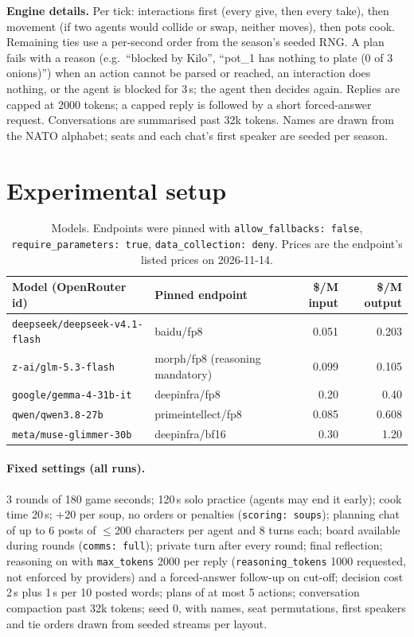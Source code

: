 \documentclass{article}
\begin{document}
\textbf{Engine details.} Per tick: interactions first (every give, then every take), then movement (if two agents would collide or swap, neither moves), then pots cook. Remaining ties use a per-second order from the season's seeded RNG. A plan fails with a reason (e.g.\ ``blocked by Kilo'', ``pot\_1 has nothing to plate (0 of 3 onions)'') when an action cannot be parsed or reached, an interaction does nothing, or the agent is blocked for 3\,s; the agent then decides again. Replies are capped at 2000 tokens; a capped reply is followed by a short forced-answer request. Conversations are summarised past 32k tokens. Names are drawn from the NATO alphabet; seats and each chat's first speaker are seeded per season.

\section{Experimental setup}\label{app:setup}
\begin{table}[h]
\centering\small
\begin{tabular}{llrr}
\toprule
Model (OpenRouter id) & Pinned endpoint & \$/M input & \$/M output\\
\midrule
\texttt{deepseek/deepseek-v4.1-flash} & baidu/fp8 & 0.051 & 0.203\\
\texttt{z-ai/glm-5.3-flash} & morph/fp8 (reasoning mandatory) & 0.099 & 0.105\\
\texttt{google/gemma-4-31b-it} & deepinfra/fp8 & 0.20 & 0.40\\
\texttt{qwen/qwen3.8-27b} & primeintellect/fp8 & 0.085 & 0.608\\
\texttt{meta/muse-glimmer-30b} & deepinfra/bf16 & 0.30 & 1.20\\
\bottomrule
\end{tabular}
\caption{Models. Endpoints were pinned with \texttt{allow\_fallbacks: false}, \texttt{require\_parameters: true}, \texttt{data\_collection: deny}. Prices are the endpoint's listed prices on 2026-11-14.}
\end{table}

\paragraph{Fixed settings (all runs).} 3 rounds of 180 game seconds; 120\,s solo practice (agents may end it early); cook time 20\,s; +20 per soup, no orders or penalties (\texttt{scoring: soups}); planning chat of up to 6 posts of \(\le\)200 characters per agent and 8 turns each; board available during rounds (\texttt{comms: full}); private turn after every round; final reflection; reasoning on with \texttt{max\_tokens} 2000 per reply (\texttt{reasoning\_tokens} 1000 requested, not enforced by providers) and a forced-answer follow-up on cut-off; decision cost 2\,s plus 1\,s per 10 posted words; plans of at most 5 actions; conversation compaction past 32k tokens; seed 0, with names, seat permutations, first speakers and tie orders drawn from seeded streams per layout.
\end{document}
